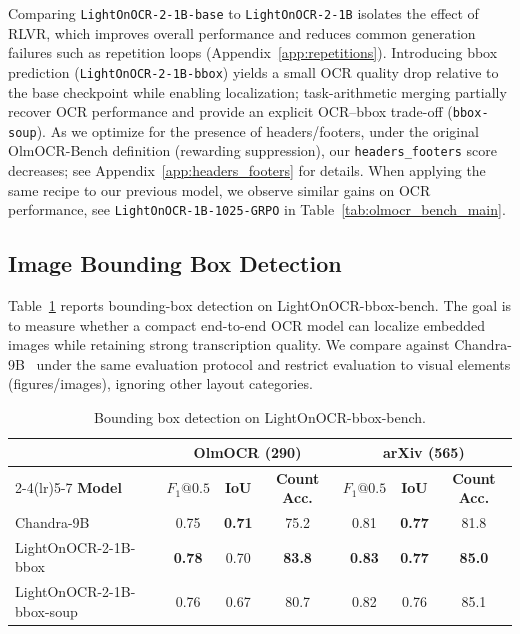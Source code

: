 \documentclass{article}
\begin{document}
Comparing \texttt{LightOnOCR-2-1B-base} to \texttt{LightOnOCR-2-1B} isolates the effect of RLVR, which improves overall performance and reduces common generation failures such as repetition loops (Appendix~\ref{app:repetitions}). Introducing bbox prediction (\texttt{LightOnOCR-2-1B-bbox}) yields a small OCR quality drop relative to the base checkpoint while enabling localization; task-arithmetic merging partially recover OCR performance and provide an explicit OCR--bbox trade-off (\texttt{bbox-soup}). As we optimize for the presence of headers/footers, under the original OlmOCR-Bench definition (rewarding suppression), our \texttt{headers\_footers} score decreases; see Appendix~\ref{app:headers_footers} for details. When applying the same recipe to our previous model, we observe similar gains on OCR performance, see \texttt{LightOnOCR-1B-1025-GRPO} in Table~\ref{tab:olmocr_bench_main}.





\subsection{Image Bounding Box Detection}
\label{sec:results_bbox_no_regression}
Table~\ref{tab:bbox_results} reports bounding-box detection on LightOnOCR-bbox-bench. The goal is to measure whether a compact end-to-end OCR model can localize embedded images while retaining strong transcription quality. We compare against Chandra-9B~\cite{chandra_repo} under the same evaluation protocol and restrict evaluation to visual elements (figures/images), ignoring other layout categories.

\begin{table}[htbp!]
\centering
\caption{Bounding box detection on LightOnOCR-bbox-bench.}
\label{tab:bbox_results}
\small
\setlength{\tabcolsep}{6pt}
\begin{tabular}{l ccc ccc}
\toprule
& \multicolumn{3}{c}{\textbf{OlmOCR (290)}} & \multicolumn{3}{c}{\textbf{arXiv (565)}} \\
\cmidrule(lr){2-4}\cmidrule(lr){5-7}
\textbf{Model} & \textbf{$F_1@0.5$} & \textbf{IoU} & \textbf{Count Acc.} & \textbf{$F_1@0.5$} & \textbf{IoU} & \textbf{Count Acc.} \\
\midrule
Chandra-9B & 0.75 & \textbf{0.71} & 75.2 & 0.81 & \textbf{0.77} & 81.8 \\
\midrule
LightOnOCR-2-1B-bbox & \textbf{0.78} & 0.70 & \textbf{83.8} & \textbf{0.83} & \textbf{0.77} & \textbf{85.0} \\
LightOnOCR-2-1B-bbox-soup & 0.76 & 0.67 & 80.7 & 0.82 & 0.76 & 85.1 \\

\bottomrule
\end{tabular}
\end{table}
\end{document}
